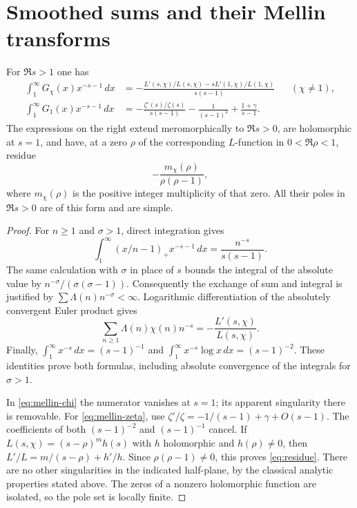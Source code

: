 \section{Smoothed sums and their Mellin transforms}
\label{sec:mellin}

\begin{lemma}\label{lem:mellin}
For $\Re s>1$ one has
\begin{align}
 \int_1^\infty G_\chi(x)x^{-s-1}\,dx
  &=-\frac{L'(s,\chi)/L(s,\chi)
                  -sL'(1,\chi)/L(1,\chi)}{s(s-1)}
                       &&(\chi\ne1),\label{eq:mellin-chi}\\
 \int_1^\infty G_1(x)x^{-s-1}\,dx
  &=-\frac{\zeta'(s)/\zeta(s)}{s(s-1)}
      -\frac1{(s-1)^2}+\frac{1+\gamma}{s-1}.
                       \label{eq:mellin-zeta}
\end{align}
The expressions on the right extend meromorphically to $\Re s>0$,
are holomorphic at $s=1$, and have, at a zero $\rho$ of the
corresponding $L$-function in $0<\Re\rho<1$, residue
\begin{equation}\label{eq:residue}
                    -\frac{m_\chi(\rho)}{\rho(\rho-1)},
\end{equation}
where $m_\chi(\rho)$ is the positive integer multiplicity of that zero.
All their poles in $\Re s>0$ are of this form and are simple.
\end{lemma}

\begin{proof}
For $n\ge1$ and $\sigma>1$, direct integration gives
\[
 \int_1^\infty(x/n-1)_+x^{-s-1}\,dx
 =\frac{n^{-s}}{s(s-1)}.
\]
The same calculation with $\sigma$ in place of $s$ bounds the integral
of the absolute value by $n^{-\sigma}/(\sigma(\sigma-1))$.
Consequently the exchange of sum and integral is justified by
$\sum\Lambda(n)n^{-\sigma}<\infty$. Logarithmic differentiation of
the absolutely convergent Euler product gives
\[
       \sum_{n\ge1}\Lambda(n)\chi(n)n^{-s}
                         =-\frac{L'(s,\chi)}{L(s,\chi)}.
\]
Finally,
$\int_1^\infty x^{-s}\,dx=(s-1)^{-1}$ and
$\int_1^\infty x^{-s}\log x\,dx=(s-1)^{-2}$.
These identities prove both formulas, including absolute convergence
of the integrals for $\sigma>1$.

In \eqref{eq:mellin-chi} the numerator vanishes at $s=1$; its
apparent singularity there is removable. For \eqref{eq:mellin-zeta},
use $\zeta'/\zeta=-1/(s-1)+\gamma+O(s-1)$.
The coefficients of both $(s-1)^{-2}$ and $(s-1)^{-1}$ cancel.
If $L(s,\chi)=(s-\rho)^m h(s)$ with $h$ holomorphic and
$h(\rho)\ne0$, then $L'/L=m/(s-\rho)+h'/h$.
Since $\rho(\rho-1)\ne0$, this proves \eqref{eq:residue}.
There are no other singularities in the indicated half-plane, by
the classical analytic properties stated above. The zeros of a
nonzero holomorphic function are isolated, so the pole set is locally
finite.
\end{proof}


